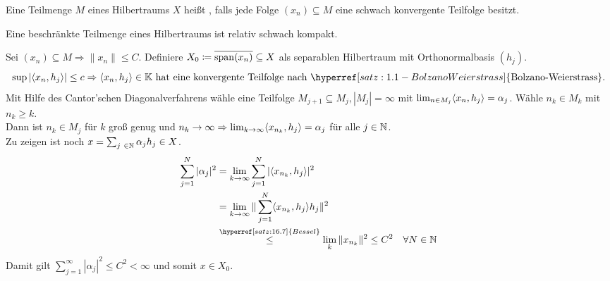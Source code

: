 \begin{definition} 
	Eine Teilmenge $M$ eines Hilbertraums $X$ hei{\ss}t , falls jede Folge $(x_{n}) \subseteq M$ eine schwach konvergente Teilfolge besitzt.
\end{definition}


\begin{satz}
	Eine beschränkte Teilmenge eines Hilbertraums ist relativ schwach kompakt.	
\end{satz}

\begin{beweis}
	Sei $(x_{n}) \subseteq M \Rightarrow \| x_{n} \| \leq C$. Definiere $X_{0} \coloneqq \overline{\operatorname{span}(x_{n})} \subseteq X$ als separablen Hilbertraum mit Orthonormalbasis $(h_{j})$.	
		\[ \sup | \< x_{n} , h_{j} \> | \leq c \Rightarrow \< x_{n} , h_{j} \> \in \MdK \text{ hat eine konvergente Teilfolge nach } \hyperref[satz:1.1-BolzanoWeierstrass]{\text{Bolzano-Weierstrass}}. \]
		Mit Hilfe des Cantor'schen Diagonalverfahrens wähle eine Teilfolge $M_{j+1} \subseteq M_{j}, |M_{j}| = \infty$ mit $\lim_{n \in M_{j}} \langle x_{n} , h_{j} \rangle = \alpha_{j}$. Wähle $n_{k} \in M_{k}$ mit $n_{k} \geq k$. \\
		Dann ist $n_{k} \in M_{j}$ für $k$ gro{\ss} genug und $n_{k} \rightarrow \infty \Rightarrow \lim_{k \rightarrow \infty} \langle x_{n_{k}} , h_{j} \rangle = \alpha_{j}$ für alle $j \in \mathbb{N}$. \\
		Zu zeigen ist noch $x = \sum_{j \in \MdN} \alpha_{j} h_{j} \in X$.
		\begin{align*}
			\sum_{j = 1}^{N} | \alpha_{j} |^{2} & = \lim_{k \rightarrow \infty} \sum_{j = 1}^{N} | \< x_{n_{k}} , h_{j} \> |^{2} \\
				& = \lim_{k \rightarrow \infty} \| \sum_{j = 1}^{N} \< x_{n_{k}} , h_{j} \> h_{j} \|^{2} \\
				& \overset{\hyperref[satz:16.7]{Bessel}}{\leq} \lim_{k} \| x_{n_{k}} \|^{2} \leq C^{2} \quad \forall N \in \MdN
		\end{align*}
		Damit gilt $\sum_{j = 1}^{\infty} | \alpha_{j} |^{2} \leq C^{2} < \infty$ und somit $x \in X_{0}$.
\end{beweis}



\newpage